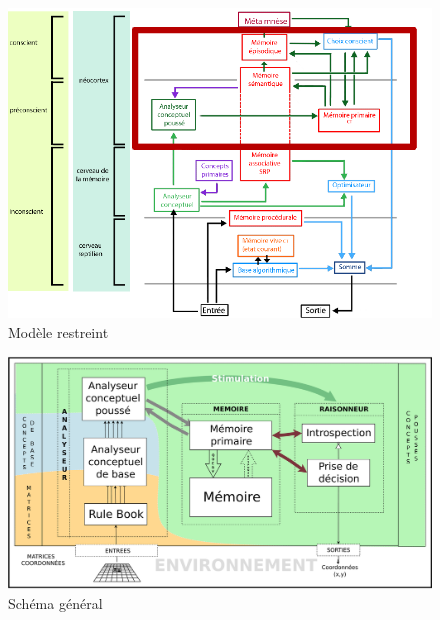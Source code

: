 \begin{figure}[H] 
\includegraphics[width=\textwidth]{files/modele_restreint} 
\caption{Modèle restreint} 
\end{figure}

\begin{figure}[H] 
\includegraphics[width=\textwidth]{files/simplified_general_diagram} 
\caption{Schéma général} 
\end{figure}